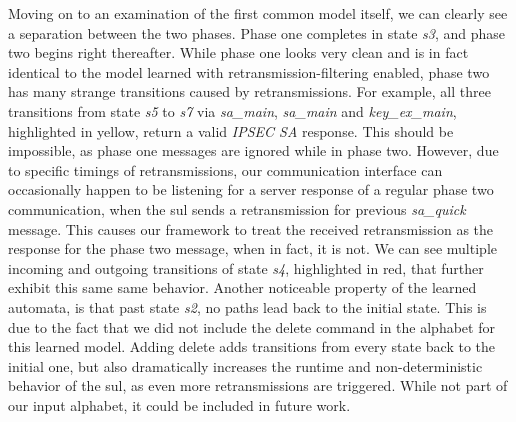 Moving on to an examination of the first common model itself, we can clearly see a separation between the two phases. Phase one completes in state \emph{s3}, and phase two begins right thereafter. While phase one looks very clean and is in fact identical to the model learned with retransmission-filtering enabled, phase two has many strange transitions caused by retransmissions. For example, all three transitions from state \emph{s5} to \emph{s7} via \emph{sa\_main}, \emph{sa\_main} and \emph{key\_ex\_main}, highlighted in yellow, return a valid \emph{IPSEC SA} response. This should be impossible, as phase one messages are ignored while in phase two. However, due to specific timings of retransmissions, our communication interface can occasionally happen to be listening for a server response of a regular phase two communication, when the \ac{sul} sends a retransmission for previous \emph{sa\_quick} message. This causes our framework to treat the received retransmission as the response for the phase two message, when in fact, it is not. We can see multiple incoming and outgoing transitions of state \emph{s4}, highlighted in red, that further exhibit this same same behavior.
Another noticeable property of the learned automata, is that past state \emph{s2}, no paths lead back to the initial state. This is due to the fact that we did not include the delete command in the alphabet for this learned model. Adding delete adds transitions from every state back to the initial one, but also dramatically increases the runtime and non-deterministic behavior of the \ac{sul}, as even more retransmissions are triggered. While not part of our input alphabet, it could be included in future work.

